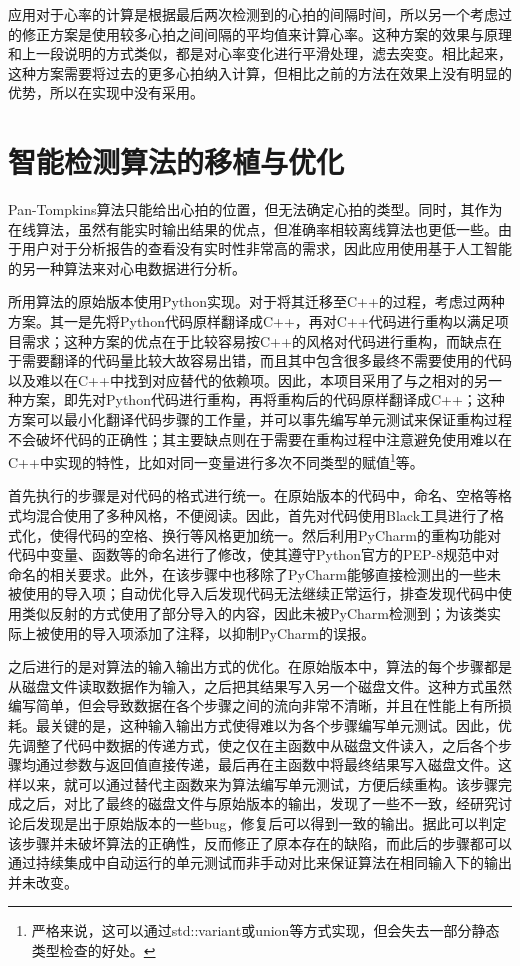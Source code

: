 应用对于心率的计算是根据最后两次检测到的心拍的间隔时间，所以另一个考虑过的修正方案是使用较多心拍之间间隔的平均值来计算心率。这种方案的效果与原理和上一段说明的方式类似，都是对心率变化进行平滑处理，滤去突变。相比起来，这种方案需要将过去的更多心拍纳入计算，但相比之前的方法在效果上没有明显的优势，所以在实现中没有采用。


\section{智能检测算法的移植与优化}\label{sec:ai}

Pan-Tompkins算法只能给出心拍的位置，但无法确定心拍的类型。同时，其作为在线算法，虽然有能实时输出结果的优点，但准确率相较离线算法也更低一些。由于用户对于分析报告的查看没有实时性非常高的需求，因此应用使用基于人工智能的另一种算法来对心电数据进行分析。

所用算法的原始版本使用Python实现。对于将其迁移至C++的过程，考虑过两种方案。其一是先将Python代码原样翻译成C++，再对C++代码进行重构以满足项目需求；这种方案的优点在于比较容易按C++的风格对代码进行重构，而缺点在于需要翻译的代码量比较大故容易出错，而且其中包含很多最终不需要使用的代码以及难以在C++中找到对应替代的依赖项。因此，本项目采用了与之相对的另一种方案，即先对Python代码进行重构，再将重构后的代码原样翻译成C++；这种方案可以最小化翻译代码步骤的工作量，并可以事先编写单元测试来保证重构过程不会破坏代码的正确性；其主要缺点则在于需要在重构过程中注意避免使用难以在C++中实现的特性，比如对同一变量进行多次不同类型的赋值\footnote{严格来说，这可以通过std::variant或union等方式实现，但会失去一部分静态类型检查的好处。}等。

首先执行的步骤是对代码的格式进行统一。在原始版本的代码中，命名、空格等格式均混合使用了多种风格，不便阅读。因此，首先对代码使用Black工具进行了格式化，使得代码的空格、换行等风格更加统一。然后利用PyCharm的重构功能对代码中变量、函数等的命名进行了修改，使其遵守Python官方的PEP-8规范中对命名的相关要求。此外，在该步骤中也移除了PyCharm能够直接检测出的一些未被使用的导入项；自动优化导入后发现代码无法继续正常运行，排查发现代码中使用类似反射的方式使用了部分导入的内容，因此未被PyCharm检测到；为该类实际上被使用的导入项添加了注释，以抑制PyCharm的误报。

之后进行的是对算法的输入输出方式的优化。在原始版本中，算法的每个步骤都是从磁盘文件读取数据作为输入，之后把其结果写入另一个磁盘文件。这种方式虽然编写简单，但会导致数据在各个步骤之间的流向非常不清晰，并且在性能上有所损耗。最关键的是，这种输入输出方式使得难以为各个步骤编写单元测试。因此，优先调整了代码中数据的传递方式，使之仅在主函数中从磁盘文件读入，之后各个步骤均通过参数与返回值直接传递，最后再在主函数中将最终结果写入磁盘文件。这样以来，就可以通过替代主函数来为算法编写单元测试，方便后续重构。该步骤完成之后，对比了最终的磁盘文件与原始版本的输出，发现了一些不一致，经研究讨论后发现是出于原始版本的一些bug，修复后可以得到一致的输出。据此可以判定该步骤并未破坏算法的正确性，反而修正了原本存在的缺陷，而此后的步骤都可以通过持续集成中自动运行的单元测试而非手动对比来保证算法在相同输入下的输出并未改变。

